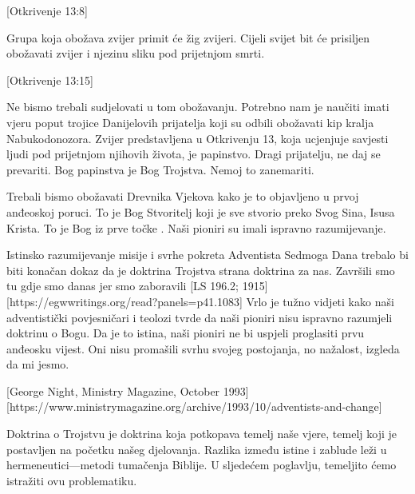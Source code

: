 [Otkrivenje 13:8]

Grupa koja obožava zvijer primit će žig zvijeri. Cijeli svijet bit će prisiljen obožavati zvijer i njezinu sliku pod prijetnjom smrti.

[Otkrivenje 13:15]

Ne bismo trebali sudjelovati u tom obožavanju. Potrebno nam je naučiti imati vjeru poput trojice Danijelovih prijatelja koji su odbili obožavati kip kralja Nabukodonozora. Zvijer predstavljena u Otkrivenju 13, koja ucjenjuje savjesti ljudi pod prijetnjom njihovih života, je papinstvo. Dragi prijatelju, ne daj se prevariti. Bog papinstva je Bog Trojstva. Nemoj to zanemariti.

Trebali bismo obožavati Drevnika Vjekova kako je to objavljeno u prvoj anđeoskoj poruci. To je Bog Stvoritelj koji je sve stvorio preko Svog Sina, Isusa Krista. To je Bog iz prve točke . Naši pioniri su imali ispravno razumijevanje.

Istinsko razumijevanje misije i svrhe pokreta Adventista Sedmoga Dana trebalo bi biti konačan dokaz da je doktrina Trojstva strana doktrina za nas. Završili smo tu gdje smo danas jer smo zaboravili [LS 196.2; 1915][https://egwwritings.org/read?panels=p41.1083] Vrlo je tužno vidjeti kako naši adventistički povjesničari i teolozi tvrde da naši pioniri nisu ispravno razumjeli doktrinu o Bogu. Da je to istina, naši pioniri ne bi uspjeli proglasiti prvu anđeosku vijest. Oni nisu promašili svrhu svojeg postojanja, no nažalost, izgleda da mi jesmo.

[George Night, Ministry Magazine, October 1993][https://www.ministrymagazine.org/archive/1993/10/adventists-and-change]

Doktrina o Trojstvu je doktrina koja potkopava temelj naše vjere, temelj koji je postavljen na početku našeg djelovanja. Razlika između istine i zablude leži u hermeneutici—metodi tumačenja Biblije. U sljedećem poglavlju, temeljito ćemo istražiti ovu problematiku.

